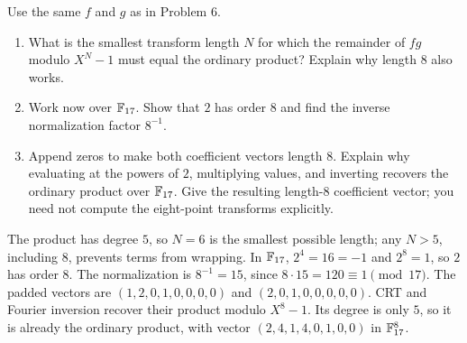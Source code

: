 \ifsolutions\newpage\fi
{}
Use the same $f$ and $g$ as in Problem 6.
\begin{enumerate}
 \item What is the smallest transform length $N$ for which the
 remainder of $fg$ modulo $X^N-1$ must equal the ordinary product?
 Explain why length $8$ also works. 
 \item Work now over $\mathbb F_{17}$. Show that $2$ has order $8$ and find
 the inverse normalization factor $8^{-1}$. 
 \item Append zeros to make both coefficient vectors length $8$.
 Explain why evaluating at the powers of $2$, multiplying values,
 and inverting recovers the ordinary product over $\mathbb F_{17}$.
 Give the resulting length-$8$ coefficient vector; you need not compute
 the eight-point transforms explicitly. 
\end{enumerate}
\begin{solution}
The product has degree $5$, so $N=6$ is the smallest possible length;
any $N>5$, including $8$, prevents terms from wrapping.
In $\mathbb F_{17}$, $2^4=16=-1$ and $2^8=1$, so $2$ has order $8$.
The normalization is $8^{-1}=15$, since $8\cdot15=120\equiv1\pmod{17}$.
The padded vectors are $(1,2,0,1,0,0,0,0)$ and $(2,0,1,0,0,0,0,0)$.
CRT and Fourier inversion recover their product modulo $X^8-1$.
Its degree is only $5$, so it is already the ordinary product, with vector
$(2,4,1,4,0,1,0,0)$ in $\mathbb F_{17}^8$.
\end{solution}

